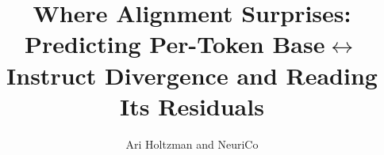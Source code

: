 \documentclass{article}
\title{Where Alignment Surprises: Predicting Per-Token Base$\leftrightarrow$Instruct Divergence and Reading Its Residuals}
\author{Ari Holtzman and NeuriCo}
\begin{document}
\maketitle

\begin{abstract}

\end{abstract}









\end{document}
